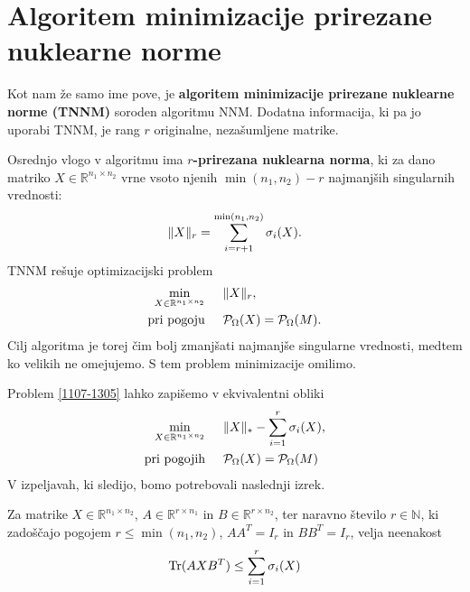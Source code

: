 \section{Algoritem minimizacije prirezane nuklearne norme}
Kot nam že samo ime pove, je \textbf{algoritem minimizacije prirezane nuklearne norme (TNNM)} \cite{TNNM-HZYLH12} soroden algoritmu NNM. Dodatna informacija, ki pa jo uporabi TNNM, je rang $r$ originalne, nezašumljene matrike.

Osrednjo vlogo v algoritmu ima \textbf{$r$-prirezana nuklearna norma}, ki za dano matriko $X \in \mathbb{R}^{n_1 \times n_2}$ vrne vsoto njenih $\min(n_1,n_2) - r$ najmanjših singularnih vrednosti:
\[
    \lVert X\rVert_r = \sum^{\min(n_1, n_2)}_{i = r + 1} \sigma_i(X).
\]
TNNM rešuje optimizacijski problem 
\begin{align}
\label{1107-1305}
\begin{split}
    \min_{X\in  \mathbb{R}^{n_1 \times n_2}}              & \hspace{0.5cm} \lVert X\rVert_r, \\
    \textrm{pri pogoju} & \hspace{0.5cm} \mathcal{P}_\Omega(X) = \mathcal{P}_\Omega(M).
    \end{split}
\end{align}
Cilj algoritma je torej čim bolj zmanjšati najmanjše singularne vrednosti, medtem ko velikih ne omejujemo. S tem problem minimizacije omilimo.

Problem \eqref{1107-1305} lahko zapišemo v ekvivalentni obliki
\begin{align}
\label{2507-0835}
\begin{split}
    \min_{X\in  \mathbb{R}^{n_1 \times n_2}}              & \hspace{0.5cm} \lVert X\rVert_* - \sum_{i=1}^{r} \sigma_i(X), \\
    \textrm{pri pogojih} & \hspace{0.5cm} \mathcal{P}_\Omega(X) = \mathcal{P}_\Omega(M)
\end{split}
\end{align}
V izpeljavah, ki sledijo, bomo potrebovali naslednji izrek.

\begin{theorem}
\label{2507-0850}
    Za matrike $X \in \mathbb{R}^{n_1 \times n_2}$, $A \in \mathbb{R}^{r \times n_1}$ in $B \in \mathbb{R}^{r \times n_2}$,
    ter naravno število $r \in \mathbb{N}$, ki zadoščajo pogojem $r \leq \min(n_1, n_2)$, $AA^T = I_{r}$  in $BB^T = I_{r}$, velja neenakost
    \begin{align}
    \label{2507-0836}
        \operatorname{Tr}(AXB^T) \leq \sum_{i=1}^{r} \sigma_i(X)
    \end{align}
\end{theorem}

